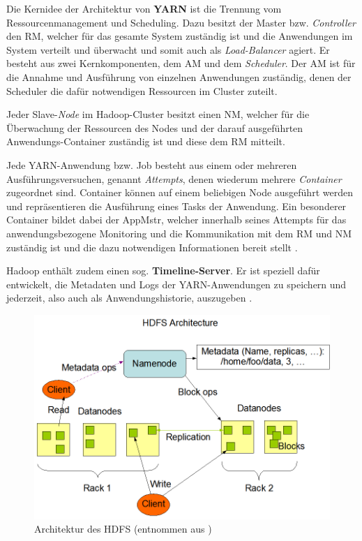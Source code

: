 Die Kernidee der Architektur von \textbf{YARN} ist die Trennung vom Ressourcenmanagement und Scheduling. Dazu besitzt der Master bzw. \emph{Controller} den \ac{RM}, welcher für das gesamte System zuständig ist und die Anwendungen im System verteilt und überwacht und somit auch als \emph{Load-Balancer} agiert. Er besteht aus zwei Kernkomponenten, dem \ac{AM} und dem \emph{Scheduler}. Der \ac{AM} ist für die Annahme und Ausführung von einzelnen Anwendungen zuständig, denen der Scheduler die dafür notwendigen Ressourcen im Cluster zuteilt.

Jeder Slave-\emph{Node} im Hadoop-Cluster besitzt einen \ac{NM}, welcher für die Überwachung der Ressourcen des Nodes und der darauf ausgeführten Anwendungs-Container zuständig ist und diese dem \ac{RM} mitteilt.

Jede YARN-Anwendung bzw. Job besteht aus einem oder mehreren Ausführungsversuchen, genannt \emph{Attempts}, denen wiederum mehrere \emph{Container} zugeordnet sind. Container können auf einem beliebigen Node ausgeführt werden und repräsentieren die Ausführung eines Tasks der Anwendung. Ein besonderer Container bildet dabei der \ac{AppMstr}, welcher innerhalb seines Attempts für das anwendungsbezogene Monitoring und die Kommunikation mit dem \ac{RM} und \ac{NM} zuständig ist und die dazu notwendigen Informationen bereit stellt \cite{HadoopYarnArch271}.

Hadoop enthält zudem einen sog. \textbf{Timeline-Server}. Er ist speziell dafür entwickelt, die Metadaten und Logs der YARN-Anwendungen zu speichern und jederzeit, also auch als Anwendungshistorie, auszugeben \cite{HadoopYarnTlServer271}.

\begin{figure}
    \centering
    \includegraphics[width=.8\columnwidth]{./images/hdfsarchitecture.png}
    \caption[Architektur des HDFS]{Architektur des HDFS (entnommen aus \cite{HadoopHdfsDesc271})}
    \label{fig:hdfsarch}
\end{figure}

